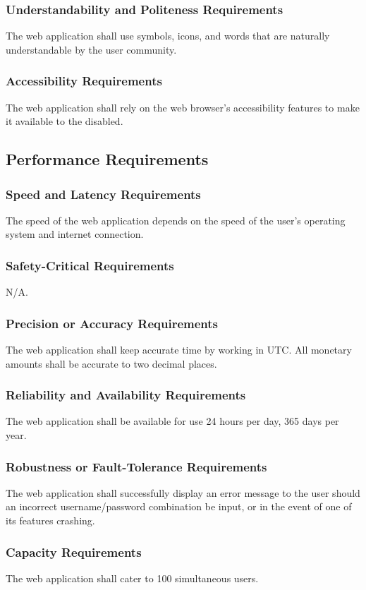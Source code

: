 \documentclass[12pt, titlepage]{article}
\begin{document}
{\subsubsection{Understandability and Politeness Requirements}
The web application shall use symbols, icons, and words that are naturally 
understandable by the user community. 
\subsubsection{Accessibility Requirements}
The web application shall rely on the web browser's accessibility features to 
make it available to the disabled.
\subsection{Performance Requirements}
\subsubsection{Speed and Latency Requirements}
The speed of the web application depends on the speed of the user's operating 
system and internet connection.
\subsubsection{Safety-Critical Requirements}
N/A.
\subsubsection{Precision or Accuracy Requirements}
The web application shall keep accurate time by working in UTC. All monetary 
amounts shall be accurate to two decimal places. 
\subsubsection{Reliability and Availability Requirements}
The web application shall be available for use 24 hours per day, 365 days per 
year.
\subsubsection{Robustness or Fault-Tolerance Requirements}
The web application shall successfully display an error message to the user 
should an incorrect username/password combination be input, or in the event of 
one of its features crashing.  
\subsubsection{Capacity Requirements}
The web application shall cater to 100 simultaneous users. 
}
\end{document}
